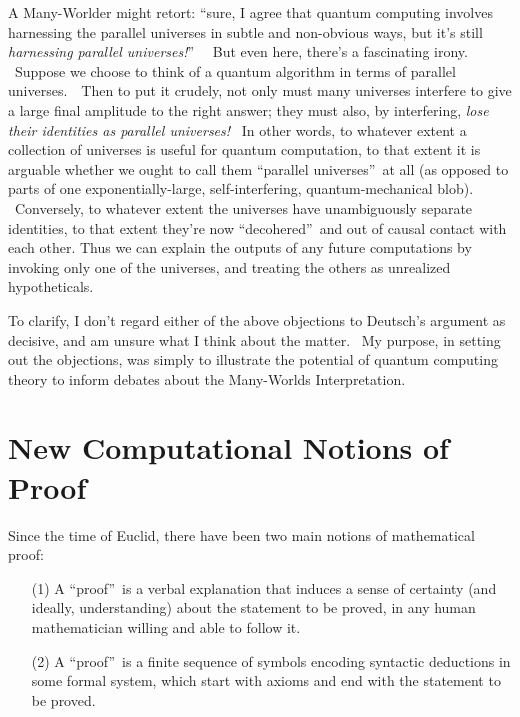 \documentclass[11pt,onecolumn]{article}%
\begin{document}
A Many-Worlder might retort: \textquotedblleft sure, I agree that quantum
computing involves harnessing the parallel universes in subtle and non-obvious
ways, but it's still \textit{harnessing parallel universes!}\textquotedblright%
\ \ But even here, there's a fascinating irony. \ Suppose we choose to think
of a quantum algorithm in terms of parallel universes.\ \ Then to put it
crudely, not only must many universes interfere to give a large final
amplitude to the right answer; they must also, by interfering, \textit{lose
their identities as parallel universes!} \ In other words, to whatever extent
a collection of universes is useful for quantum computation, to that extent it
is arguable whether we ought to call them \textquotedblleft parallel
universes\textquotedblright\ at all (as opposed to parts of one
exponentially-large, self-interfering, quantum-mechanical blob). \ Conversely,
to whatever extent the universes have unambiguously separate identities, to
that extent they're now \textquotedblleft decohered\textquotedblright\ and out
of causal contact with each other. Thus we can explain the outputs of any
future computations by invoking only one of the universes, and treating the
others as unrealized hypotheticals.

To clarify, I don't regard either of the above objections to Deutsch's
argument as decisive, and am unsure what I think about the matter. \ My
purpose, in setting out the objections, was simply to illustrate the potential
of quantum computing theory to inform debates about the Many-Worlds Interpretation.

\section{New Computational Notions of Proof\label{PROOF}}

Since the time of Euclid, there have been two main notions of mathematical proof:

\begin{enumerate}
\item[(1)] A \textquotedblleft proof\textquotedblright\ is a verbal
explanation that induces a sense of certainty (and ideally, understanding)
about the statement to be proved, in any human mathematician willing and able
to follow it.

\item[(2)] A \textquotedblleft proof\textquotedblright\ is a finite sequence
of symbols encoding syntactic deductions in some formal system, which start
with axioms and end with the statement to be proved.
\end{enumerate}
\end{document}
